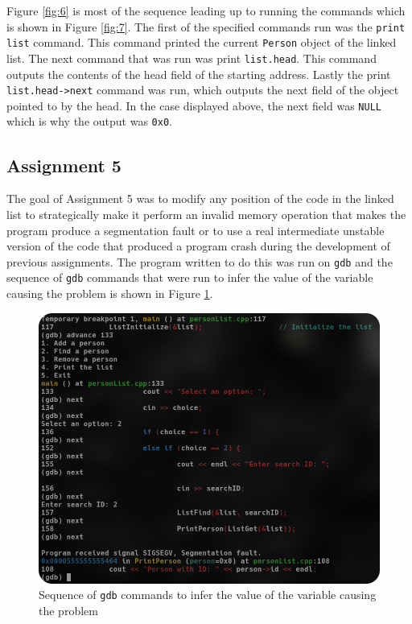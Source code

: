 \documentclass[
	letterpaper, %
	10pt, %
]{CSUniSchoolLabReport}
\begin{document}
Figure \ref{fig:6} is most of the sequence leading up to running the commands which is shown in Figure \ref{fig:7}. The first of the specified commands run was the \texttt{print list} command. This command printed the current \texttt{Person} object of the linked list. The next command that was run was print \texttt{list.head}. This command outputs the contents of the head field of the starting address. Lastly the print \texttt{list.head->next} command was run, which outputs the next field of the object pointed to by the head. In the case displayed above, the next field was \texttt{NULL} which is why the output was \texttt{0x0}.

\subsection{Assignment 5}

The goal of Assignment 5 was to modify any position of the code in the linked list to strategically make it perform an invalid memory operation that makes the program produce a segmentation fault or to use a real intermediate unstable version of the code that produced a program crash during the development of previous assignments. The program written to do this was run on \texttt{gdb} and the sequence of \texttt{gdb} commands that were run to infer the value of the variable causing the problem is shown in Figure \ref{fig:8}. 

\begin{figure}[H]
  \centering
  \includegraphics[width=.9\textwidth]{Figures/Assign5.png}
  \caption{Sequence of \texttt{gdb} commands to infer the value of the variable causing the problem}
  \label{fig:8}
\end{figure}
\end{document}

